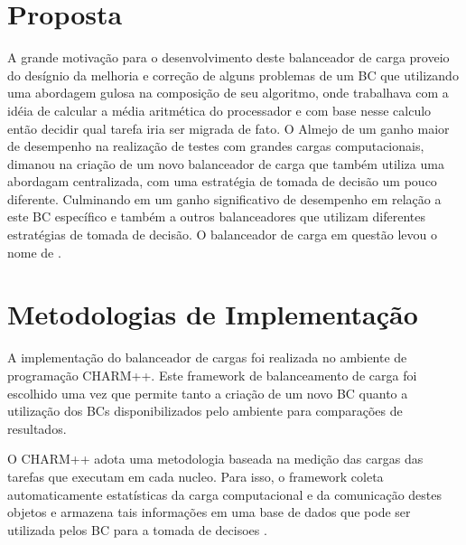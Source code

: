 \section{Proposta}
A grande motivação para o desenvolvimento deste balanceador de carga proveio do desígnio da melhoria e correção de alguns problemas de um BC que utilizando uma abordagem gulosa na composição de seu algoritmo, onde trabalhava com a idéia de calcular a média aritmética do processador e com base nesse calculo então decidir qual tarefa iria ser migrada de fato. O Almejo de um ganho maior de desempenho na realização de testes com grandes cargas computacionais, dimanou na criação de um novo balanceador de carga que também utiliza uma abordagam centralizada, com uma estratégia de tomada de decisão um pouco diferente. Culminando em um ganho significativo de desempenho em relação a este BC específico e também a outros balanceadores que utilizam diferentes estratégias de tomada de decisão. O balanceador de carga em questão levou o nome de \newlb.    


\section{Metodologias de Implementação}
A implementação do balanceador de cargas \newlb foi realizada no ambiente de programação CHARM++. Este framework de balanceamento de carga foi escolhido uma vez que permite tanto a criação de um novo BC quanto a utilização dos BCs disponibilizados pelo ambiente para comparações de resultados.

O CHARM++ adota uma metodologia baseada na medição das cargas das tarefas que executam em cada nucleo. Para isso, o framework coleta automaticamente estatísticas da carga computacional e da comunicação destes objetos e armazena tais informações em uma base de dados que pode ser utilizada pelos BC para a tomada de decisoes \cite{jyothi2004debugging}.


